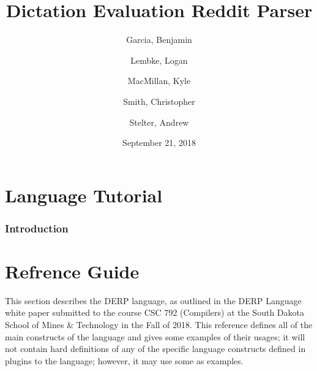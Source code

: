 \documentclass{article}
\title{\textbf{Dictation Evaluation Reddit Parser}}
\author{
Garcia, Benjamin \and
Lembke, Logan \and 
MacMillan, Kyle  \and 
Smith, Christopher \and 
Stelter, Andrew 
}
\date{September 21, 2018}
\begin{document}
\maketitle %

\newpage
\tableofcontents




\newpage
\hypersetup{
    colorlinks,
    citecolor=blue,
    filecolor=black,
    linkcolor=blue,
    urlcolor=blue
}


\part{Language Tutorial}
\section{Introduction}






\part{Refrence Guide}
This section describes the DERP language, as outlined in the DERP Language white paper submitted
 to the course CSC 792 (Compilers) at the South Dakota School of Mines & Technology in the Fall 
 of 2018. This reference defines all of the main constructs of the language and gives some examples 
 of their usages; it will not contain hard definitions of any of the specific language constructs 
 defined in plugins to the language; however, it may use some as examples.






\end{document}
